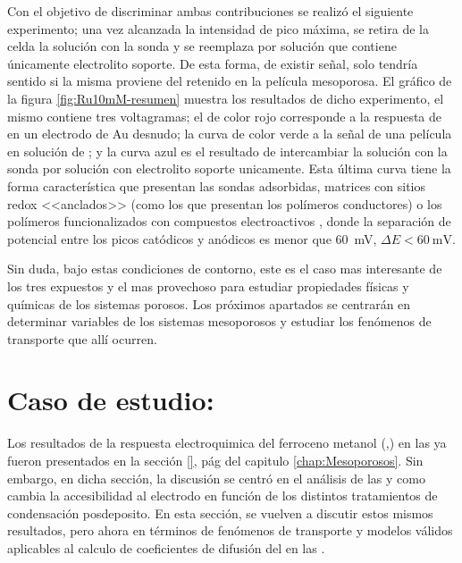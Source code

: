 		Con el objetivo de discriminar ambas contribuciones se realizó el siguiente experimento; una vez alcanzada la intensidad de pico máxima, se retira de la celda la solución con la sonda y se reemplaza por solución que contiene únicamente electrolito soporte. De esta forma, de existir señal, solo tendría sentido si la misma proviene del \ru\space retenido en la película mesoporosa. El gráfico de la figura \ref{fig:Ru10mM-resumen} muestra los resultados de dicho experimento, el mismo contiene tres voltagramas; el de color rojo corresponde a la respuesta de \ru\space en un electrodo de Au desnudo; la curva de color verde a la señal de una película en solución de \ru; y la curva azul es el resultado de intercambiar la solución con la sonda por solución con electrolito soporte unicamente. Esta última curva tiene la forma característica que presentan las sondas adsorbidas, matrices con sitios redox <<anclados>>\cite{Ybarra2005} (como los que presentan los polímeros conductores) o los polímeros funcionalizados con compuestos electroactivos \cite{Rohlfing2005,Vila2015}, donde la separación de potencial entre los picos catódicos y anódicos es menor que \SI{60}{\milli\volt}, $\Delta E < \SI{60}{\milli\volt}$\cite{Wi2000}.

		Sin duda, bajo estas condiciones de contorno, este es el caso mas interesante de los tres expuestos y el mas provechoso para estudiar propiedades físicas y químicas de los sistemas porosos. Los próximos apartados se centrarán en determinar variables de los sistemas mesoporosos y estudiar los fenómenos de transporte que allí ocurren.

\section{Caso de estudio: \texorpdfstring{\ferroceno}{FeOH}}\label{sec:difusion}

	 Los resultados de la respuesta electroquimica del ferroceno metanol \linebreak (\ferroceno,\fc) en las \pdmF\space ya fueron presentados en la sección \ref{}, pág \pageref{key} del capitulo \ref{chap:Mesoporosos}. Sin embargo, en dicha sección, la discusión se centró en el análisis de las \pdm\space y como cambia la accesibilidad al electrodo en función de los distintos tratamientos de condensación posdeposito.
	 En esta sección, se vuelven a discutir estos mismos resultados, pero ahora en términos de fenómenos de transporte y modelos válidos aplicables al calculo de coeficientes de difusión del \fc\space en las \pdm.

